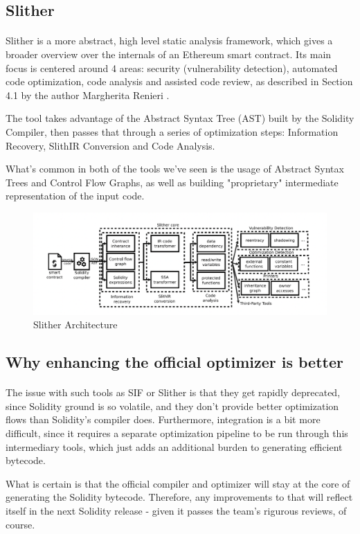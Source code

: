 \subsection{Slither}
\paragraph*{}
Slither is a more abstract, high level static analysis framework, which gives a broader overview over the internals of an Ethereum smart contract. Its main focus is centered around 4 areas: security (vulnerability detection), automated code optimization, code analysis and assisted code review, as described in Section 4.1 by the author Margherita Renieri \cite{slither}.

The tool takes advantage of the Abstract Syntax Tree (AST) built by the Solidity Compiler, then passes that through a series of optimization steps: Information Recovery, SlithIR Conversion and Code Analysis.

What's common in both of the tools we've seen is the usage of Abstract Syntax Trees and Control Flow Graphs, as well as building "proprietary" intermediate representation of the input code.

\begin{figure}
    \centering
    \includegraphics[width=15cm]{images/slither_architecture.png}
    \caption{Slither Architecture}
    \label{fig:slither-architecture}
\end{figure}

\subsection*{Why enhancing the official optimizer is better}
\paragraph*{}
The issue with such tools as SIF or Slither is that they get rapidly deprecated, since Solidity ground is so volatile, and they don't provide better optimization flows than Solidity's compiler does. Furthermore, integration is a bit more difficult, since it requires a separate optimization pipeline to be run through this intermediary tools, which just adds an additional burden to generating efficient bytecode.

What is certain is that the official compiler and optimizer will stay at the core of generating the Solidity bytecode. Therefore, any improvements to that will reflect itself in the next Solidity release - given it passes the team's rigurous reviews, of course.